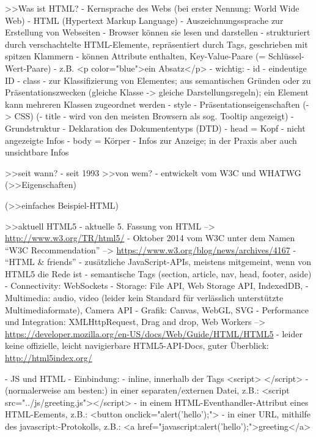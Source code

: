\documentclass[a4paper, 12pt, listof=totoc, bibliography=totoc]{scrreprt}
\begin{document}
>>Was ist HTML?
	- Kernsprache des Webs (bei erster Nennung: World Wide Web)
	- HTML (Hypertext Markup Language)
	- Auszeichnungssprache zur Erstellung von Webseiten
	- Browser können sie lesen und darstellen
	- strukturiert durch verschachtelte HTML-Elemente, repräsentiert durch Tags, geschrieben mit spitzen Klammern
		- können Attribute enthalten, Key-Value-Paare (= Schlüssel-Wert-Paare)
		- z.B. <p color="blue">ein Absatz</p>
		- wichtig:
			- id - eindeutige ID
			- class - zur Klassifizierung von Elementes; aus semantischen Gründen oder zu Präsentationszwecken (gleiche Klasse -> gleiche Darstellungsregeln); ein Element kann mehreren Klassen zugeordnet werden
			- style - Präsentationseigenschaften (-> CSS)
			(- title - wird von den meisten Browsern als sog. Tooltip angezeigt)
	- Grundstruktur
		- Deklaration des Dokumententyps (DTD)
		- head = Kopf - nicht angezeigte Infos
		- body = Körper - Infos zur Anzeige; in der Praxis aber auch unsichtbare Infos
	
>>seit wann?
	- seit 1993
>>von wem?
	- entwickelt vom W3C und WHATWG
(>>Eigenschaften)

(>>einfaches Beispiel-HTML)

>>aktuell HTML5
	- aktuelle 5. Fassung von HTML  -->  \url{http://www.w3.org/TR/html5/}
	- Oktober 2014 vom W3C unter dem Namen "`W3C Recommendation"'  -->  \url{https://www.w3.org/blog/news/archives/4167}
	- "`HTML \& friends"' - zusätzliche JavaScript-APIs, meistens mitgemeint, wenn von HTML5 die Rede ist
		- semantische Tags (section, article, nav, head, footer, aside)
		- Connectivity: WebSockets
		- Storage: File API, Web Storage API, IndexedDB, 
		- Multimedia: audio, video (leider kein Standard für verlässlich unterstützte Multimediaformate), Camera API
		- Grafik: Canvas, WebGL, SVG
		- Performance und Integration: XMLHttpRequest, Drag and drop, Web Workers
	-->  \url{https://developer.mozilla.org/en-US/docs/Web/Guide/HTML/HTML5}
	- leider keine offizielle, leicht navigierbare HTML5-API-Docs, guter Überblick: \url{http://html5index.org/}

- JS und HTML
	- Einbindung:
		- inline, innerhalb der Tags <script> </script>
		- (normalerweise am besten:) in einer separaten/externen Datei, z.B.: <script src="../js/greeting.js"></script>
		- in einem HTML-Eventhandler-Attribut eines HTML-Eements, z.B.: <button onclick="alert('hello');">
		- in einer URL, mithilfe des javascript:-Protokolls, z.B.: <a href="javascript:alert('hello');">greeting</a>
\end{document}
